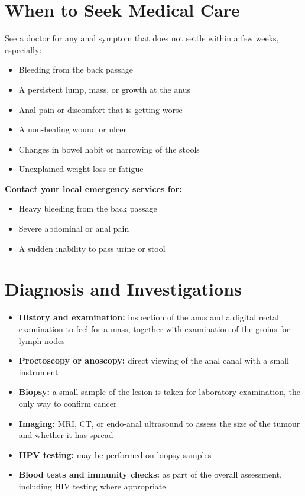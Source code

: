 \section*{When to Seek Medical Care}
See a doctor for any anal symptom that does not settle within a few weeks, especially:
\begin{itemize}
    \item Bleeding from the back passage
    \item A persistent lump, mass, or growth at the anus
    \item Anal pain or discomfort that is getting worse
    \item A non-healing wound or ulcer
    \item Changes in bowel habit or narrowing of the stools
    \item Unexplained weight loss or fatigue
\end{itemize}

\textbf{Contact your local emergency services for:}
\begin{itemize}
    \item Heavy bleeding from the back passage
    \item Severe abdominal or anal pain
    \item A sudden inability to pass urine or stool
\end{itemize}

\section*{Diagnosis and Investigations}
\begin{itemize}
    \item \textbf{History and examination:} inspection of the anus and a digital rectal examination to feel for a mass, together with examination of the groins for lymph nodes
    \item \textbf{Proctoscopy or anoscopy:} direct viewing of the anal canal with a small instrument
    \item \textbf{Biopsy:} a small sample of the lesion is taken for laboratory examination, the only way to confirm cancer
    \item \textbf{Imaging:} MRI, CT, or endo-anal ultrasound to assess the size of the tumour and whether it has spread
    \item \textbf{HPV testing:} may be performed on biopsy samples
    \item \textbf{Blood tests and immunity checks:} as part of the overall assessment, including HIV testing where appropriate
\end{itemize}

